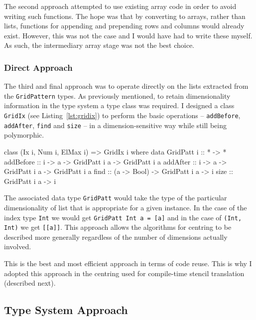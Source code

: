 \documentclass[12pt,a4paper,twoside]{scrbook}
\begin{document}
The second approach attempted to use existing array code in order to avoid
writing such functions. The hope was that by converting to arrays, rather than
lists, functions for appending and prepending rows and columns would already
exist. However, this was not the case and I would have had to write these
myself. As such, the intermediary array stage was not the best choice.

\subsubsection{Direct Approach}

The third and final approach was to operate directly on the lists extracted from
the \texttt{GridPattern} types. As previously mentioned, to retain
dimensionality information in the type system a type class was required.  I
designed a class \texttt{GridIx} (see Listing~\ref{lst:gridix}) to perform the
basic operations -- \texttt{addBefore}, \texttt{addAfter}, \texttt{find} and
\texttt{size} -- in a dimension-sensitive way while still being polymorphic.

\begin{hflisting}[label={lst:gridix}, caption=The class declaration of
  \texttt{GridIx} showing the main functions defined for the grid manipulation.]
class (Ix i, Num i, ElMax i) => GridIx i where
    data GridPatt i :: * -> *
    addBefore :: i -> a -> GridPatt i a -> GridPatt i a
    addAfter :: i -> a -> GridPatt i a -> GridPatt i a
    find :: (a -> Bool) -> GridPatt i a -> i
    size :: GridPatt i a -> i
\end{hflisting}

The associated data type \texttt{GridPatt} would take the type of the particular
dimensionality of list that is appropriate for a given instance. In the case of
the index type \texttt{Int} we would get \texttt{GridPatt Int a = {[}a{]}} and
in the case of \texttt{(Int, Int)} we get \texttt{{[}{[}a{]}{]}}. This approach
allows the algorithms for centring to be described more generally regardless of
the number of dimensions actually involved.

This is the best and most efficient approach in terms of code reuse. This is why
I adopted this approach in the centring used for compile-time stencil
translation (described next).

\subsection{Type System Approach}
\label{sec:typesysapp}
\end{document}
